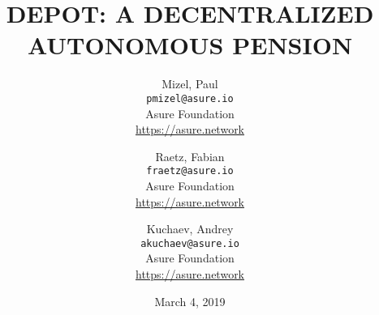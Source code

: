 
\title{DEPOT: A DECENTRALIZED AUTONOMOUS PENSION}
\author{
  Mizel, Paul\\
  \texttt{pmizel@asure.io}\\
  Asure Foundation \\ 
  {\url{https://asure.network}}\\
  \and
  Raetz, Fabian\\
  \texttt{fraetz@asure.io}\\
  Asure Foundation \\ 
  {\url{https://asure.network}}\\
  \and
  Kuchaev, Andrey\\
  \texttt{akuchaev@asure.io}\\
  Asure Foundation \\ 
  {\url{https://asure.network}}\\
}

\date{March 4, 2019}
\maketitle

